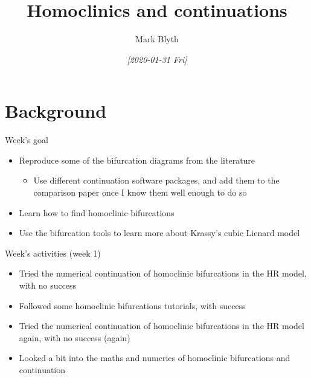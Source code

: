 \documentclass[presentation]{beamer}
\author{Mark Blyth}
\date{\textit{[2020-01-31 Fri]}}
\title{Homoclinics and continuations}
\begin{document}
\maketitle

\section{Background}
\label{sec:orgfb3687c}
\begin{frame}[label={sec:orgcc056ab}]{Week's goal}
\begin{itemize}
\item Reproduce some of the bifurcation diagrams from the literature
\begin{itemize}
\item Use different continuation software packages, and add them to the comparison paper once I know them well enough to do so
\end{itemize}
\item Learn how to find homoclinic bifurcations
\item Use the bifurcation tools to learn more about Krassy's cubic Lienard model
\end{itemize}
\end{frame}
\begin{frame}[label={sec:org169a6ba}]{Week's activities (week 1)}
\begin{itemize}[<+->]
\item Tried the numerical continuation of homoclinic bifurcations in the HR model, with no success
\item Followed some homoclinic bifurcations tutorials, with success
\item Tried the numerical continuation of homoclinic bifurcations in the HR model again, with no success (again)
\item Looked a bit into the maths and numerics of homoclinic bifurcations and continuation
\end{itemize}
\end{frame}
\end{document}
